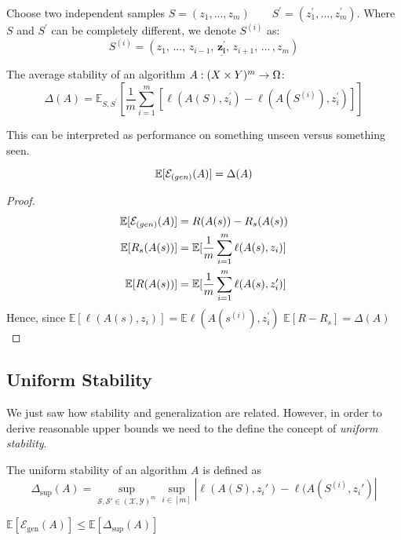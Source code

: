 Choose two independent samples $S = (z_1, ... , z_m) \quad \quad  S^{\prime} = (z^{\prime}_1, ... ,z^{\prime}_{m})$. Where 
$S$ and $S^{\prime}$ can be completely different, we denote $S^{(i)}$ as:
$$S^{(i)} = (z_1, \,... ,\, z_{i-1}, \,\underline{\mathbf{z_{i}^{\prime}}},\, z_{i+1}, \,... \,,z_{m})$$
\begin{definition} The average stability of an algorithm $A: (X \times Y)^{m} \rightarrow \Omega$:
$$\Delta(A) = \mathbb{E}_{S, S^{\prime}}[\frac{1}{m}\sum_{i=1}^{m}[\ell(A(S),z_i^{\prime}) - \ell(A(S^{(i)}),z_{i}^{\prime})]]$$
\end{definition}
This can be interpreted as performance on something unseen versus something seen.
\begin{theorem}
$$\mathbb{E}[\mathcal{E}_{\text(gen)}(A)] = \Delta(A)$$
\end{theorem}
\begin{proof}
\begin{align*}
\mathbb{E}[\mathcal{E}_{\text(gen)}(A)]  &= R(A(s)) - R_{s}(A(s)) \\
\mathbb{E} [R_{s}(A(s))] &= \mathbb{E}[\frac{1}{m}\sum_{i=1}^{m}\ell(A(s),z_i)] \\
\mathbb{E} [R(A(s))]&= \mathbb{E}[\frac{1}{m}\sum_{i=1}^{m}\ell(A(s),z_i^{\prime})]
\end{align*}
Hence, since $\mathbb{E}[\ell(A(s),z_i)] = \mathbb{E}\ell(A(s^{(i)}),z_i^{\prime})$
$\mathbb{E}[R - R_s] = \Delta(A)$
\end{proof}





\subsection{Uniform Stability}
We just saw how stability and generalization are related. However, in order to derive reasonable upper bounds we need to the define the concept of \textit{uniform stability}.

\begin{definition}The uniform stability of an algorithm $A$ is defined as 
\begin{equation*}
\Delta_{\sup} (A) = \sup_{\mathcal{S}, \mathcal{S}' \in ( \mathcal{X}, \mathcal{Y} )^m } \sup_{i \in [m]} |\ell(A(S), z_i') - \ell(A(S^{(i)}, z_i')|
\end{equation*}
\end{definition}

\begin{corollary}
    $\mathbb{E}[\mathcal{E}_{\text{gen}}(A)] \leq \mathbb{E}[\Delta_{\sup} (A)]$
\end{corollary}

